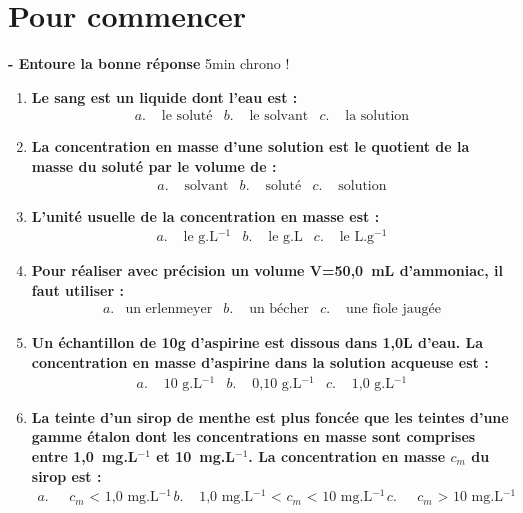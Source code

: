 \section{Pour commencer}
\begin{mdframed}[style=autreexo]
\textbf{ - Entoure la bonne réponse} 5min chrono !\\
\begin{enumerate}
    \item \textbf{Le sang est un liquide dont l'eau est :}
\begin{align*}
    a.& \text{ le soluté} & b.& \text{ le solvant} & c.& \text{ la solution}
\end{align*}
    \item \textbf{La concentration en masse d'une solution est le quotient de la masse du soluté par le volume de :}
    \begin{align*}
        a.& \text{ solvant} & b.& \text{ soluté} & c.& \text{ solution}
    \end{align*}
    \item \textbf{L'unité usuelle de la concentration en masse est :}
    \begin{align*}
        a.& \text{ le g.L$^{-1}$} & b.& \text{ le g.L} & c.& \text{  le L.g$^{-1}$}
    \end{align*}
    \item \textbf{Pour réaliser avec précision un volume V=50,0~mL d'ammoniac, il faut utiliser : }
    \begin{align*}
        a.& \text{un erlenmeyer} & b.& \text{ un bécher} & c.& \text{  une fiole jaugée}
    \end{align*}
    \item \textbf{Un échantillon de 10g d'aspirine est dissous dans 1,0L d'eau. La concentration en masse d'aspirine dans la solution acqueuse est :}
    \begin{align*}
        a.& \text{ 10 g.L$^{-1}$} & b.& \text{ 0,10 g.L$^{-1}$} & c.& \text{  1,0 g.L$^{-1}$}
    \end{align*}
    \item \textbf{La teinte d'un sirop de menthe est plus foncée que les teintes d'une gamme étalon dont les concentrations en masse sont comprises entre 1,0~mg.L$^{-1}$ et 10~mg.L$^{-1}$. La concentration en masse $c_m$ du sirop est :}
    \begin{align*}
        a.& \text{ $c_m$ < 1,0~mg.L$^{-1}$} & b.& \text{ 1,0~mg.L$^{-1}$ < $c_m$ < 10~mg.L$^{-1}$} & c.& \text{  $c_m$ > 10~mg.L$^{-1}$}
    \end{align*}
\end{enumerate}
\end{mdframed}

